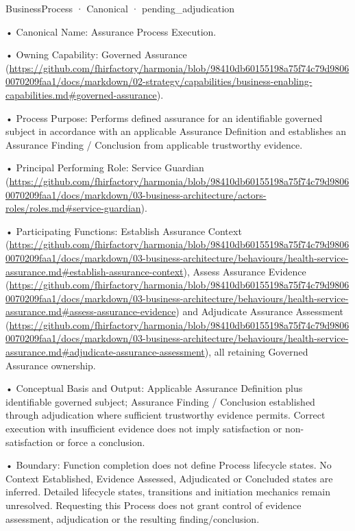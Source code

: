 \label{element:3c67e57403b041bb8ccdaf3980b6ff94}
{\small BusinessProcess · Canonical · pending\_adjudication}\par

•
Canonical Name: Assurance Process Execution.



•
Owning Capability: Governed Assurance (\url{https://github.com/fhirfactory/harmonia/blob/98410db60155198a75f74c79d98060070209faa1/docs/markdown/02-strategy/capabilities/business-enabling-capabilities.md#governed-assurance}).



•
Process Purpose: Performs defined assurance for an identifiable governed subject in accordance with an applicable Assurance Definition and establishes an Assurance Finding / Conclusion from applicable trustworthy evidence.



•
Principal Performing Role: Service Guardian (\url{https://github.com/fhirfactory/harmonia/blob/98410db60155198a75f74c79d98060070209faa1/docs/markdown/03-business-architecture/actors-roles/roles.md#service-guardian}).



•
Participating Functions: Establish Assurance Context (\url{https://github.com/fhirfactory/harmonia/blob/98410db60155198a75f74c79d98060070209faa1/docs/markdown/03-business-architecture/behaviours/health-service-assurance.md#establish-assurance-context}), Assess Assurance Evidence (\url{https://github.com/fhirfactory/harmonia/blob/98410db60155198a75f74c79d98060070209faa1/docs/markdown/03-business-architecture/behaviours/health-service-assurance.md#assess-assurance-evidence}) and Adjudicate Assurance Assessment (\url{https://github.com/fhirfactory/harmonia/blob/98410db60155198a75f74c79d98060070209faa1/docs/markdown/03-business-architecture/behaviours/health-service-assurance.md#adjudicate-assurance-assessment}), all retaining Governed Assurance ownership.



•
Conceptual Basis and Output: Applicable Assurance Definition plus identifiable governed subject; Assurance Finding / Conclusion established through adjudication where sufficient trustworthy evidence permits. Correct execution with insufficient evidence does not imply satisfaction or non-satisfaction or force a conclusion.



•
Boundary: Function completion does not define Process lifecycle states. No Context Established, Evidence Assessed, Adjudicated or Concluded states are inferred. Detailed lifecycle states, transitions and initiation mechanics remain unresolved. Requesting this Process does not grant control of evidence assessment, adjudication or the resulting finding/conclusion.



